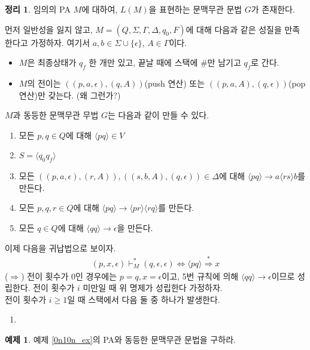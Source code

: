 \documentclass[b5paper, 10pt]{book}
\theoremstyle{definition}
\newtheorem{thm}[defn]{정리}
\newtheorem{ex}[defn]{예제}
\newenvironment{pf*}{\pushQED{\qed}\pf}{\popQED\endpf}
\begin{document}
\begin{thm}
임의의 PA $M$에 대하여, $L(M)$을 표현하는 문맥무관 문법 $G$가 존재한다. 
\end{thm}
\begin{pf*}
먼저 일반성을 잃지 않고, $M = (Q, \Sigma, \Gamma, \Delta, q_0, F)$에 대해
다음과 같은 성질을 만족한다고 가정하자. 여기서 $a, b\in \Sigma \cup \{\epsilon\}$, $A\in\Gamma$이다.
\begin{itemize}
    \item $M$은 최종상태가 $q_f$ 한 개만 있고, 끝날 때에 스택에 \#만 남기고 $q_f$로 간다.
    \item $M$의 전이는 $((p, a, \epsilon), (q, A))$(push 연산) 또는 
    $((p, a, A), (q, \epsilon))$(pop 연산)만 갖는다. (왜 그런가?)
\end{itemize}
$M$과 동등한 문맥무관 무법 $G$는 다음과 같이 만들 수 있다.
\begin{enumerate}
    \item 모든 $p, q \in Q$에 대해 $\langle pq \rangle \in V$
    \item $S = \langle q_0 q_f\rangle$
    \item 모든 $((p,a,\epsilon),(r,A)), ((s,b,A),(q,\epsilon)) \in \Delta$에 대해
    $\langle pq \rangle \rightarrow a \langle rs \rangle b$를 만든다. 
    \item 모든 $p, q, r \in Q$에 대해 $\langle pq \rangle \rightarrow \langle pr \rangle \langle rq \rangle$를
    만든다.
    \item 모든 $q \in Q$에 대해 $\langle qq \rangle \rightarrow \epsilon$을 만든다.
\end{enumerate}
이제 다음을 귀납법으로 보이자.
\begin{align*}
    (p, x, \epsilon) \vdash^*_M (q, \epsilon, \epsilon) \Leftrightarrow
    \langle pq \rangle \overset{*}{\Rightarrow} x
\end{align*}
($\Rightarrow$) 전이 횟수가 0인 경우에는 $p=q, x = \epsilon$이고,
5번 규칙에 의해 $\langle qq \rangle \rightarrow \epsilon$이므로
성립한다. 전이 횟수가 $i$ 미만일 때 위 명제가 성립한다 가정하자. \\
전이 횟수가 $i \ge 1$일 때 스택에서 다음 둘 중 하나가 발생한다.
\begin{enumerate}
    \item 
\end{enumerate}
\end{pf*}
\begin{ex}
    예제 \ref{0n10n_ex}의 PA와 동등한 문맥무관 문법을 구하라. 
\end{ex}
\end{document}
